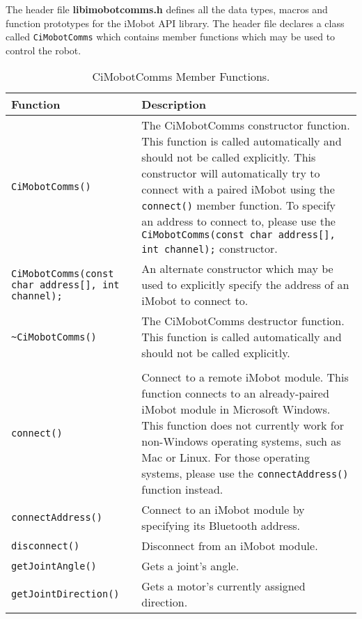 \noindent
The header file {\bf libimobotcomms.h} defines all the data types, macros 
and function prototypes for the iMobot API library. The header file
declares a class called \texttt{CiMobotComms} which contains member functions which
may be used to control the robot.

\begin{table}[!hp]
\begin{center}
\caption{CiMobotComms Member Functions.}
\begin{tabular}{p{38 mm}p{77 mm}}
\hline
Function & Description \\
\hline
\texttt{CiMobotComms()} \dotfill & The CiMobotComms constructor function. This function
is called automatically and should not be called explicitly. This constructor will 
automatically try to connect with a paired iMobot using the \texttt{connect()} member
function. To specify an address to connect to, please use the
\texttt{CiMobotComms(const char address[], int channel);} constructor.\\
\texttt{CiMobotComms(const char address[], int channel);} \dotfill & 
An alternate constructor which may be used to explicitly specify the address of an iMobot 
to connect to. \\
\texttt{\textasciitilde CiMobotComms()} \dotfill & The CiMobotComms destructor function. This function
is called automatically and should not be called explicitly. \\
& \\
\texttt{connect()} \dotfill & Connect to a remote iMobot module. This function connects to an already-paired iMobot module in Microsoft Windows. This function does not currently work for non-Windows operating systems, such as Mac or Linux. For those operating systems, please use the \texttt{connectAddress()} function instead. \\
\texttt{connectAddress()} \dotfill & Connect to an iMobot module by specifying its Bluetooth address. \\
\texttt{disconnect()} \dotfill & Disconnect from an iMobot module. \\
\texttt{getJointAngle()} \dotfill & Gets a joint's angle. \\
\texttt{getJointDirection()} \dotfill & Gets a motor's currently assigned direction. \\

\end{tabular}
\end{center}
\end{table}
